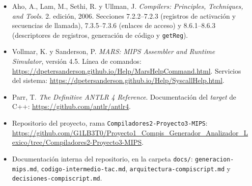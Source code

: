 \documentclass[11pt,a4paper]{article}
\begin{document}
\begin{itemize}[leftmargin=1.4em]
  \item Aho, A., Lam, M., Sethi, R. y Ullman, J. \emph{Compilers: Principles,
        Techniques, and Tools}. 2.\textordfeminine{} edición, 2006. Secciones
        7.2.2--7.2.3 (registros de activación y secuencias de llamada),
        7.3.5--7.3.6 (enlaces de acceso) y 8.6.1--8.6.3 (descriptores de
        registros, generación de código y \texttt{getReg}).
  \item Vollmar, K. y Sanderson, P. \emph{MARS: MIPS Assembler and Runtime
        Simulator}, versión 4.5. Línea de comandos:
        \url{https://dpetersanderson.github.io/Help/MarsHelpCommand.html}.
        Servicios del sistema:
        \url{https://dpetersanderson.github.io/Help/SyscallHelp.html}.
  \item Parr, T. \emph{The Definitive ANTLR 4 Reference}. Documentación del
        \emph{target} de C++: \url{https://github.com/antlr/antlr4}.
  \item Repositorio del proyecto, rama \texttt{Compiladores2-Proyecto3-MIPS}:
        \url{https://github.com/G1LB3T0/Proyecto1_Compis_Generador_Analizador_Lexico/tree/Compiladores2-Proyecto3-MIPS}.
  \item Documentación interna del repositorio, en la carpeta \texttt{docs/}:
        \texttt{generacion-\allowbreak mips.md},
        \texttt{codigo-\allowbreak intermedio-\allowbreak tac.md},
        \texttt{arquitectura-\allowbreak compiscript.md} y
        \texttt{decisiones-\allowbreak compiscript.md}.
\end{itemize}
\end{document}
